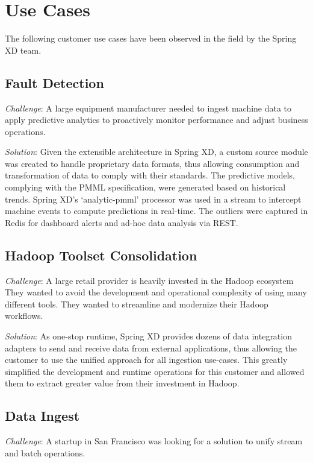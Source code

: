 \section{Use Cases}
\label{sec:Use Cases}

The following customer use cases have been observed in the field by the Spring XD team.

\subsection{Fault Detection}
\textit{Challenge}: A large equipment manufacturer needed to
ingest machine data to apply predictive analytics to proactively monitor
performance and adjust business operations.

\textit{Solution}: Given the extensible architecture in Spring XD, a custom
source module was created to handle proprietary data formats, thus allowing
consumption and transformation of data to comply with their
standards. The predictive models, complying with the PMML specification, were
generated based on historical trends. Spring XD's `analytic-pmml' processor was
used in a stream to intercept machine events to compute predictions in
real-time. The outliers were captured in Redis\cite{redis} for dashboard alerts
and ad-hoc data analysis via REST.

\subsection{Hadoop Toolset Consolidation}

\textit{Challenge}: A large retail provider is heavily invested in the Hadoop ecosystem
They wanted to avoid the development and operational complexity of using many
different tools. They wanted to streamline and modernize their Hadoop workflows.

\textit{Solution}: As one-stop runtime, Spring XD provides dozens of data integration
adapters to send and receive data from external applications, thus allowing
the customer to use the unified approach for all ingestion use-cases. This
greatly simplified the development and runtime operations for this customer
and allowed them to extract greater value from their investment in Hadoop.

\subsection{Data Ingest}
\textit{Challenge}: A startup in San Francisco was looking for a solution to
unify stream and batch operations.

